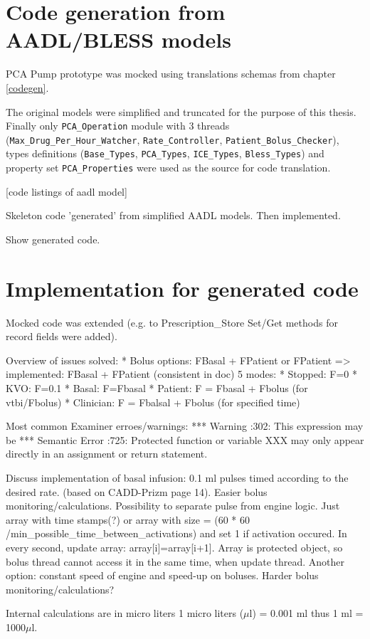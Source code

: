 \section{Code generation from AADL/BLESS models}
\label{pcapumpimpl:codegen}

PCA Pump prototype was mocked using translations schemas from chapter \ref{codegen}.

The original models were simplified and truncated for the purpose of this thesis. Finally only \lstinline{PCA_Operation} module with 3 threads (\lstinline{Max_Drug_Per_Hour_Watcher}, \lstinline{Rate_Controller}, \lstinline{Patient_Bolus_Checker}), types definitions (\lstinline{Base_Types}, \lstinline{PCA_Types}, \lstinline{ICE_Types}, \lstinline{Bless_Types}) and property set \lstinline{PCA_Properties} were used as the source for code translation.

[code listings of aadl model]


Skeleton code 'generated' from simplified AADL models. Then implemented.

Show generated code.



\section{Implementation for generated code}
\label{pcapumpimpl:codegenimpl}

Mocked code was extended (e.g. to Prescription\_Store Set/Get methods for record fields were added).

Overview of issues solved: 
* Bolus options: FBasal + FPatient or FPatient => implemented: FBasal + FPatient (consistent in doc)
5 modes:
* Stopped: F=0
* KVO: F=0.1
* Basal: F=Fbasal
* Patient: F = Fbasal + Fbolus (for vtbi/Fbolus)
* Clinician: F = Fbalsal + Fbolus (for specified time)

Most common Examiner\cite{Examiner:Online} erroes/warnings:
***        Warning                     :302: This expression may be
***        Semantic Error              :725: Protected function or variable XXX may only appear directly in an assignment or return statement.

Discuss implementation of basal infusion: 0.1 ml pulses timed according to the desired rate. (based on CADD-Prizm page 14). Easier bolus monitoring/calculations. Possibility to separate pulse from engine logic. Just array with time stamps(?) or array with size = (60 * 60 /min\_possible\_time\_between\_activations) and set 1 if activation occured. In every second, update array: array[i]=array[i+1]. Array is protected object, so bolus thread cannot access it in the same time, when update thread.
Another option: constant speed of engine and speed-up on boluses. Harder bolus monitoring/calculations?


Internal calculations are in micro liters 1 micro liters ($\mu$l) = 0.001 ml thus 1 ml = 1000$\mu$l.


